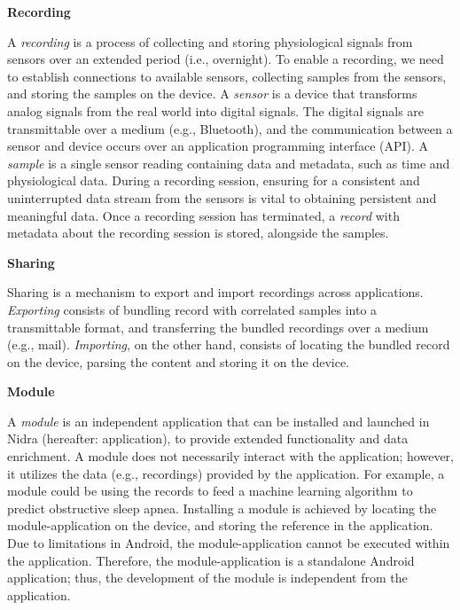 
\noindent\textbf{Recording}

\noindent A \textit{recording} is a process of collecting and storing physiological signals from sensors over an extended period (i.e., overnight). To enable a recording, we need to establish connections to available sensors, collecting samples from the sensors, and storing the samples on the device. A \textit{sensor} is a device that transforms analog signals from the real world into digital signals. The digital signals are transmittable over a medium (e.g., Bluetooth), and the communication between a sensor and device occurs over an application programming interface (API). A \textit{sample} is a single sensor reading containing data and metadata, such as time and physiological data. During a recording session, ensuring for a consistent and uninterrupted data stream from the sensors is vital to obtaining persistent and meaningful data.  Once a recording session has terminated, a \textit{record} with metadata about the recording session is stored, alongside the samples.    

\noindent \textbf{Sharing}

\noindent Sharing is a mechanism to export and import recordings across applications. \textit{Exporting} consists of bundling record with correlated samples into a transmittable format, and transferring the bundled recordings over a medium (e.g., mail). \textit{Importing}, on the other hand, consists of locating the bundled record on the device, parsing the content and storing it on the device.  

\noindent \textbf{Module}

\noindent A \textit{module} is an independent application that can be installed and launched in Nidra (hereafter: application), to provide extended functionality and data enrichment. A module does not necessarily interact with the application; however, it utilizes the data (e.g., recordings) provided by the application. For example, a module could be using the records to feed a machine learning algorithm to predict obstructive sleep apnea. Installing a module is achieved by locating the module-application on the device, and storing the reference in the application. Due to limitations in Android, the module-application cannot be executed within the application. Therefore, the module-application is a standalone Android application; thus, the development of the module is independent from the application. 

